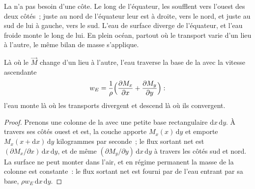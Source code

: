 La  n'a pas besoin d'une côte. Le long de l'équateur, les  soufflent vers
l'ouest des deux côtés~; juste au nord de l'équateur leur  est à droite,
vers le nord, et juste au sud de lui à gauche, vers le sud. L'eau de surface diverge
de l'équateur, et l'eau froide monte le long de lui. En plein océan, partout où le
transport varie d'un lieu à l'autre, le même bilan de masse s'applique.

\begin{proposition}\label{prop:b1:ocean-circulation:pumping}
Là où le  $\vec M$ change d'un lieu à l'autre, l'eau traverse la
base de la  avec la vitesse ascendante
\[
  w_E = \frac{1}{\rho}\Bigl(\frac{\partial M_x}{\partial x} + \frac{\partial M_y}{\partial y}\Bigr):
\]
l'eau monte là où les transports divergent et descend là où ils convergent.
\end{proposition}

\begin{proof}
Prenons une colonne de la  avec une petite base rectangulaire $\mathrm dx\,\mathrm
dy$. À travers ses côtés ouest et est, la couche apporte $M_x(x)\,\mathrm dy$
et emporte $M_x(x + \mathrm dx)\,\mathrm dy$ kilogrammes par seconde~; le flux sortant net est
$(\partial M_x/\partial x)\,\mathrm dx\,\mathrm dy$, et de même
$(\partial M_y/\partial y)\,\mathrm dx\,\mathrm dy$ à travers les côtés sud et
nord. La surface ne peut monter dans l'air, et en régime permanent la masse
de la colonne est constante~: le flux sortant net est fourni par de l'eau entrant par
sa base, $\rho w_E\,\mathrm dx\,\mathrm dy$.
\end{proof}

